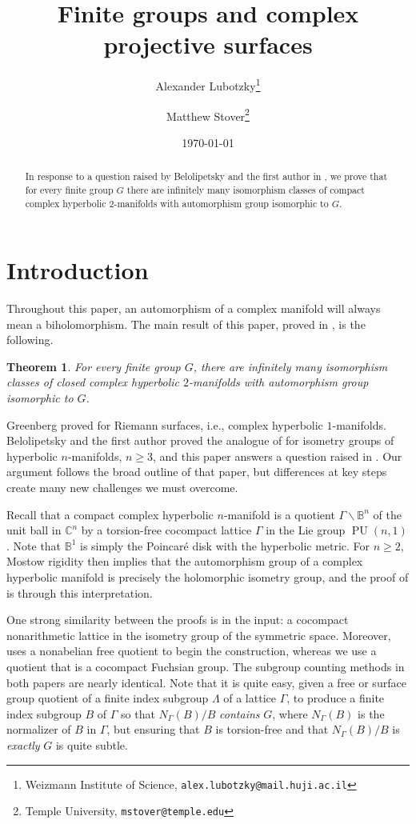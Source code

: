 \documentclass[11pt]{article}
\title{Finite groups and complex projective surfaces}
\author{Alexander Lubotzky\footnote{Weizmann Institute of Science, \texttt{alex.lubotzky@mail.huji.ac.il}} \and Matthew Stover\footnote{Temple University, \texttt{mstover@temple.edu}}}
\date{\today}
\theoremstyle{plain}
\newtheorem{thm}{Theorem}[section]
\theoremstyle{definition}
\theoremstyle{remark}
\newcommand{\bbB}{\mathbb{B}}
\newcommand{\bbC}{\mathbb{C}}
\newcommand{\Gam}{\Gamma}
\newcommand{\Lam}{\Lambda}
\DeclareMathOperator{\PU}{PU}
\newcommand{\bs}{\backslash}
\begin{document}
\maketitle

\begin{abstract}
In response to a question raised by Belolipetsky and the first author in \cite{BelolipetskyLubotzky}, we prove that for every finite group $G$ there are infinitely many isomorphism classes of compact complex hyperbolic $2$-manifolds with automorphism group isomorphic to $G$.
\end{abstract}

\section{Introduction}\label{sec:Intro}

Throughout this paper, an automorphism of a complex manifold will always mean a biholomorphism. The main result of this paper, proved in , is the following.

\begin{thm}\label{thm:Main}
For every finite group $G$, there are infinitely many isomorphism classes of closed complex hyperbolic $2$-manifolds with automorphism group isomorphic to $G$.
\end{thm}

Greenberg \cite{Greenberg} proved  for Riemann surfaces, i.e., complex hyperbolic $1$-manifolds. Belolipetsky and the first author \cite{BelolipetskyLubotzky} proved the analogue of  for isometry groups of hyperbolic $n$-manifolds, $n \ge 3$, and this paper answers a question raised in \cite[\S 6.5]{BelolipetskyLubotzky}. Our argument follows the broad outline of that paper, but differences at key steps create many new challenges we must overcome.

Recall that a compact complex hyperbolic $n$-manifold is a quotient $\Gam \bs \bbB^n$ of the unit ball in $\bbC^n$ by a torsion-free cocompact lattice $\Gam$ in the Lie group $\PU(n,1)$. Note that $\bbB^1$ is simply the Poincar\'e disk with the hyperbolic metric. For $n \ge 2$, Mostow rigidity then implies that the automorphism group of a complex hyperbolic manifold is precisely the holomorphic isometry group, and the proof of  is through this interpretation.

One strong similarity between the proofs is in the input: a cocompact nonarithmetic lattice in the isometry group of the symmetric space. Moreover, \cite{BelolipetskyLubotzky} uses a nonabelian free quotient to begin the construction, whereas we use a quotient that is a cocompact Fuchsian group. The subgroup counting methods in both papers are nearly identical. Note that it is quite easy, given a free or surface group quotient of a finite index subgroup $\Lam$ of a lattice $\Gam$, to produce a finite index subgroup $B$ of $\Gam$ so that $N_\Gam(B) / B$ \emph{contains} $G$, where $N_\Gam(B)$ is the normalizer of $B$ in $\Gam$, but ensuring that $B$ is torsion-free and that $N_\Gam(B) / B$ is \emph{exactly} $G$ is quite subtle.
\end{document}
